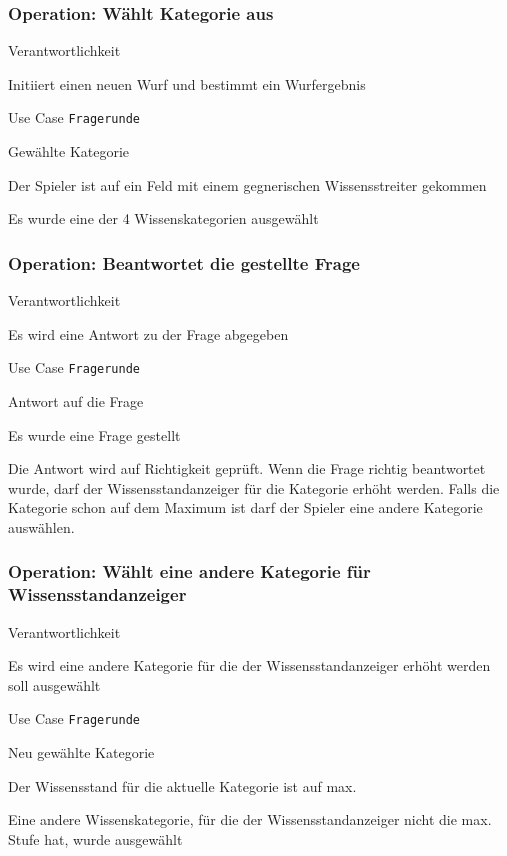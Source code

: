 \subsubsection{Operation: Wählt Kategorie aus}
\begin{labeling}[:]{Verantwortlichkeit}
\item [Verantwortlichkeit] Initiiert einen neuen Wurf und bestimmt ein Wurfergebnis
\item [Referenzen] Use Case \texttt{Fragerunde}
\item [Output] Gewählte Kategorie
\item [Vorbedingungen] Der Spieler ist auf ein Feld mit einem gegnerischen Wissensstreiter gekommen
\item [Nachbedingungen] Es wurde eine der 4 Wissenskategorien ausgewählt
\end{labeling}

\subsubsection{Operation: Beantwortet die gestellte Frage}
\begin{labeling}[:]{Verantwortlichkeit}
\item [Verantwortlichkeit] Es wird eine Antwort zu der Frage abgegeben
\item [Referenzen] Use Case \texttt{Fragerunde}
\item [Output] Antwort auf die Frage
\item [Vorbedingungen] Es wurde eine Frage gestellt
\item [Nachbedingungen] Die Antwort wird auf Richtigkeit geprüft. Wenn die Frage richtig beantwortet wurde, darf der Wissensstandanzeiger für die Kategorie erhöht werden. Falls die Kategorie schon auf dem Maximum ist darf der Spieler eine andere Kategorie auswählen.
\end{labeling}

\subsubsection{Operation: Wählt eine andere Kategorie für Wissensstandanzeiger}
\begin{labeling}[:]{Verantwortlichkeit}
\item [Verantwortlichkeit] Es wird eine andere Kategorie für die der Wissensstandanzeiger erhöht werden soll ausgewählt
\item [Referenzen] Use Case \texttt{Fragerunde}
\item [Output] Neu gewählte Kategorie
\item [Vorbedingungen] Der Wissensstand für die aktuelle Kategorie ist auf max.
\item [Nachbedingungen] Eine andere Wissenskategorie, für die der Wissensstandanzeiger nicht die max. Stufe hat, wurde ausgewählt
\end{labeling}